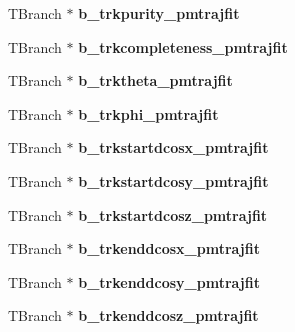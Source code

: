 \begin{DoxyCompactItemize}
\item 
\hypertarget{classanatree_aeca569e3323d1f0a200c82db4302301a}{T\-Branch $\ast$ {\bfseries b\-\_\-trkpurity\-\_\-pmtrajfit}}\label{classanatree_aeca569e3323d1f0a200c82db4302301a}

\item 
\hypertarget{classanatree_a25104c0078466f5d0de3ffe611f2416a}{T\-Branch $\ast$ {\bfseries b\-\_\-trkcompleteness\-\_\-pmtrajfit}}\label{classanatree_a25104c0078466f5d0de3ffe611f2416a}

\item 
\hypertarget{classanatree_a192cb54dc7330981fa9cc9b92e233128}{T\-Branch $\ast$ {\bfseries b\-\_\-trktheta\-\_\-pmtrajfit}}\label{classanatree_a192cb54dc7330981fa9cc9b92e233128}

\item 
\hypertarget{classanatree_a9c644532570ac09958ca3a0cf821c8cd}{T\-Branch $\ast$ {\bfseries b\-\_\-trkphi\-\_\-pmtrajfit}}\label{classanatree_a9c644532570ac09958ca3a0cf821c8cd}

\item 
\hypertarget{classanatree_a1b8b0f1cf447561daa2a3ac193da94a0}{T\-Branch $\ast$ {\bfseries b\-\_\-trkstartdcosx\-\_\-pmtrajfit}}\label{classanatree_a1b8b0f1cf447561daa2a3ac193da94a0}

\item 
\hypertarget{classanatree_ac9fe5997b2e476a2016fed21dcabeffb}{T\-Branch $\ast$ {\bfseries b\-\_\-trkstartdcosy\-\_\-pmtrajfit}}\label{classanatree_ac9fe5997b2e476a2016fed21dcabeffb}

\item 
\hypertarget{classanatree_afb0a74879ede6cfb80bd480cd30ffed9}{T\-Branch $\ast$ {\bfseries b\-\_\-trkstartdcosz\-\_\-pmtrajfit}}\label{classanatree_afb0a74879ede6cfb80bd480cd30ffed9}

\item 
\hypertarget{classanatree_a3c909f9535c74f83264e80782bdf84e2}{T\-Branch $\ast$ {\bfseries b\-\_\-trkenddcosx\-\_\-pmtrajfit}}\label{classanatree_a3c909f9535c74f83264e80782bdf84e2}

\item 
\hypertarget{classanatree_ae584bec2ef0b97997b87dfee09a1378e}{T\-Branch $\ast$ {\bfseries b\-\_\-trkenddcosy\-\_\-pmtrajfit}}\label{classanatree_ae584bec2ef0b97997b87dfee09a1378e}

\item 
\hypertarget{classanatree_a071b975050b22ffc9dff743cd188c36b}{T\-Branch $\ast$ {\bfseries b\-\_\-trkenddcosz\-\_\-pmtrajfit}}\label{classanatree_a071b975050b22ffc9dff743cd188c36b}


\end{DoxyCompactItemize}
